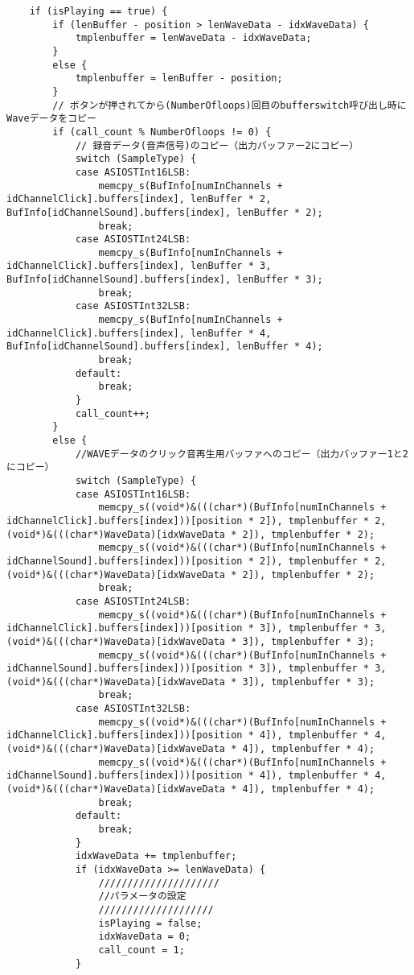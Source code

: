 \begin{verbatim}
	if (isPlaying == true) {
		if (lenBuffer - position > lenWaveData - idxWaveData) {
			tmplenbuffer = lenWaveData - idxWaveData;
		}
		else {
			tmplenbuffer = lenBuffer - position;
		}
		// ボタンが押されてから(NumberOfloops)回目のbufferswitch呼び出し時にWaveデータをコピー
		if (call_count % NumberOfloops != 0) {
			// 録音データ(音声信号)のコピー（出力バッファー2にコピー）
			switch (SampleType) {
			case ASIOSTInt16LSB:
				memcpy_s(BufInfo[numInChannels + idChannelClick].buffers[index], lenBuffer * 2, BufInfo[idChannelSound].buffers[index], lenBuffer * 2);
				break;
			case ASIOSTInt24LSB:
				memcpy_s(BufInfo[numInChannels + idChannelClick].buffers[index], lenBuffer * 3, BufInfo[idChannelSound].buffers[index], lenBuffer * 3);
				break;
			case ASIOSTInt32LSB:
				memcpy_s(BufInfo[numInChannels + idChannelClick].buffers[index], lenBuffer * 4, BufInfo[idChannelSound].buffers[index], lenBuffer * 4);
				break;
			default:
				break;
			}
			call_count++;
		}
		else {
			//WAVEデータのクリック音再生用バッファへのコピー（出力バッファー1と2にコピー）
			switch (SampleType) {
			case ASIOSTInt16LSB:
				memcpy_s((void*)&(((char*)(BufInfo[numInChannels + idChannelClick].buffers[index]))[position * 2]), tmplenbuffer * 2, (void*)&(((char*)WaveData)[idxWaveData * 2]), tmplenbuffer * 2);
				memcpy_s((void*)&(((char*)(BufInfo[numInChannels + idChannelSound].buffers[index]))[position * 2]), tmplenbuffer * 2, (void*)&(((char*)WaveData)[idxWaveData * 2]), tmplenbuffer * 2);
				break;
			case ASIOSTInt24LSB:
				memcpy_s((void*)&(((char*)(BufInfo[numInChannels + idChannelClick].buffers[index]))[position * 3]), tmplenbuffer * 3, (void*)&(((char*)WaveData)[idxWaveData * 3]), tmplenbuffer * 3);
				memcpy_s((void*)&(((char*)(BufInfo[numInChannels + idChannelSound].buffers[index]))[position * 3]), tmplenbuffer * 3, (void*)&(((char*)WaveData)[idxWaveData * 3]), tmplenbuffer * 3);
				break;
			case ASIOSTInt32LSB:
				memcpy_s((void*)&(((char*)(BufInfo[numInChannels + idChannelClick].buffers[index]))[position * 4]), tmplenbuffer * 4, (void*)&(((char*)WaveData)[idxWaveData * 4]), tmplenbuffer * 4);
				memcpy_s((void*)&(((char*)(BufInfo[numInChannels + idChannelSound].buffers[index]))[position * 4]), tmplenbuffer * 4, (void*)&(((char*)WaveData)[idxWaveData * 4]), tmplenbuffer * 4);
				break;
			default:
				break;
			}
			idxWaveData += tmplenbuffer;
			if (idxWaveData >= lenWaveData) {
				/////////////////////
				//パラメータの設定
				////////////////////
				isPlaying = false;
				idxWaveData = 0;
				call_count = 1;
			}
			

\end{verbatim}

